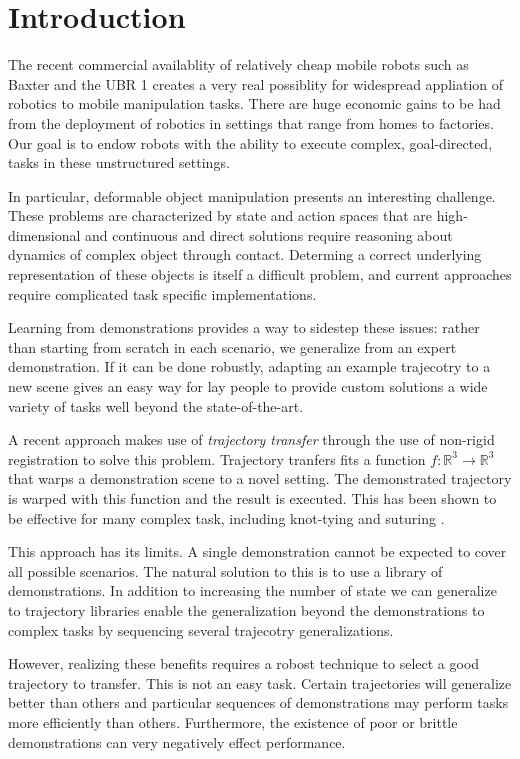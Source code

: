 \section{Introduction}
The recent commercial availablity of relatively cheap mobile robots such 
as Baxter and the UBR 1 creates a very real possiblity for widespread 
appliation of robotics to mobile manipulation tasks.
There are huge economic gains to be had from the deployment of robotics 
in settings that range from homes to factories.
Our goal is to endow robots with the ability to execute complex, goal-directed, 
tasks in these unstructured settings.

In particular, deformable object manipulation presents an interesting challenge.
These problems are characterized by state and action spaces that are high-dimensional 
and continuous and direct solutions require reasoning about dynamics of complex object 
through contact.
Determing a correct underlying representation of these objects is itself a difficult problem,
and current approaches require complicated task specific implementations.

Learning from demonstrations provides a way to sidestep these issues:
rather than starting from scratch in each scenario, we generalize from 
an expert demonstration.
If it can be done robustly, adapting an example trajecotry to a new scene 
gives an easy way for lay people to provide custom solutions a wide variety of tasks
well beyond the state-of-the-art.

A recent approach makes use of \emph{trajectory transfer} through the use of non-rigid registration to solve this problem.
Trajectory tranfers fits a function $f:\mathbb{R}^3 \rightarrow \mathbb{R}^3$ that warps a demonstration scene to a novel setting.
The demonstrated trajectory is warped with this function and the result is executed. 
This has been shown to be effective for many complex task, including knot-tying and suturing \cite{Schulmanetal_ISRR2013, Schulmanetal_IROS2013}.

This approach has its limits.
A single demonstration cannot be expected to cover all possible scenarios.
The natural solution to this is to use a library of demonstrations.
In addition to increasing the number of state we can generalize to trajectory libraries
enable the generalization beyond the demonstrations to complex tasks by sequencing 
several trajecotry generalizations.

However, realizing these benefits requires a robost technique to select a good trajectory to
transfer.
This is not an easy task.
Certain trajectories will generalize better than others and particular sequences of 
demonstrations may perform tasks more efficiently than others.
Furthermore, the existence of poor or brittle demonstrations can very negatively 
effect performance.

